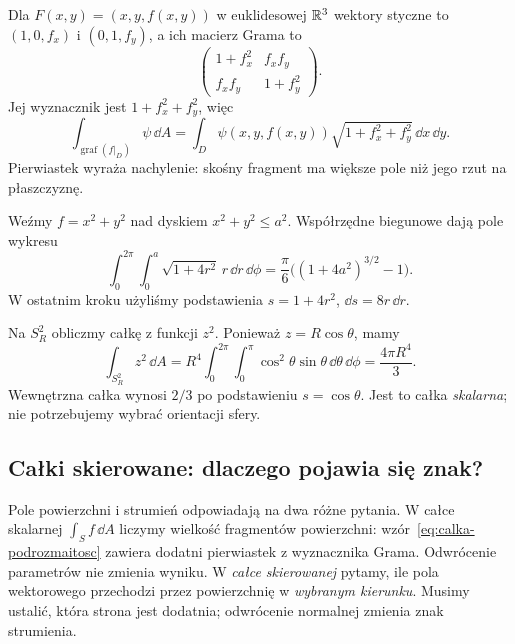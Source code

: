 \begin{przyklad}
\label{prz:calka-po-wykresie}
Dla $F(x,y)=(x,y,f(x,y))$ w euklidesowej $\mathbb{R}^3$
wektory styczne to $(1,0,f_x)$ i $(0,1,f_y)$,
a ich macierz Grama to
\[
 \begin{pmatrix}1+f_x^2&f_xf_y\\
                 f_xf_y&1+f_y^2\end{pmatrix}.
\]
Jej wyznacznik jest $1+f_x^2+f_y^2$, więc
\begin{equation}\label{eq:calka-wykres}
 \int_{\operatorname{graf}(f|_D)}\psi\,\dd A
 =\int_D\psi(x,y,f(x,y))
        \sqrt{1+f_x^2+f_y^2}\,\dd x\,\dd y.
\end{equation}
Pierwiastek wyraża nachylenie: skośny fragment
ma większe pole niż jego rzut na płaszczyznę.

Weźmy $f=x^2+y^2$ nad dyskiem $x^2+y^2\leq a^2$.
Współrzędne biegunowe dają pole wykresu
\[
 \int_0^{2\pi}\!\int_0^a
   \sqrt{1+4r^2}\,r\,\dd r\,\dd\phi
 =\frac{\pi}{6}\bigl((1+4a^2)^{3/2}-1\bigr).
\]
W ostatnim kroku użyliśmy podstawienia
$s=1+4r^2$, $\dd s=8r\,\dd r$.
\end{przyklad}

\begin{przyklad}
Na $S_R^2$ obliczmy całkę z funkcji $z^2$.
Ponieważ $z=R\cos\theta$, mamy
\[
 \int_{S_R^2}z^2\,\dd A
 =R^4\int_0^{2\pi}\!\int_0^\pi
       \cos^2\theta\sin\theta\,\dd\theta\,\dd\phi
 =\frac{4\pi R^4}{3}.
\]
Wewnętrzna całka wynosi $2/3$ po podstawieniu
$s=\cos\theta$. Jest to całka \emph{skalarna};
nie potrzebujemy wybrać orientacji sfery.
\end{przyklad}

\subsection*{Całki skierowane: dlaczego pojawia się znak?}

Pole powierzchni i strumień odpowiadają na dwa różne
pytania. W całce skalarnej
$\int_S f\,\dd A$ liczymy wielkość fragmentów
powierzchni: wzór~\eqref{eq:calka-podrozmaitosc}
zawiera dodatni pierwiastek z wyznacznika Grama.
Odwrócenie parametrów nie zmienia wyniku.
W \emph{całce skierowanej} pytamy, ile pola
wektorowego przechodzi przez powierzchnię
w \emph{wybranym kierunku}. Musimy ustalić,
która strona jest dodatnia; odwrócenie
normalnej zmienia znak strumienia.

